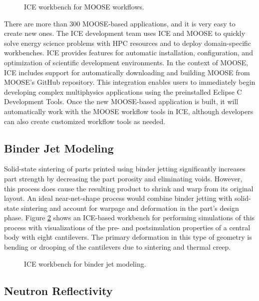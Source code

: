 \begin{figure}[htbp]
\centering
{}
\caption{ICE workbench for MOOSE workflows.}
\label{moose}
\end{figure}

There are more than 300 MOOSE-based applications, and it is very easy to create
new ones. The ICE development team uses ICE and MOOSE to quickly solve energy
science problems with HPC resources and to deploy domain-specific workbenches.
ICE provides features for automatic installation, configuration, and
optimization of scientific development environments. In the context of MOOSE,
ICE includes support for automatically downloading and building MOOSE from
MOOSE's GitHub repository. This integration enables users to immediately begin
developing complex multiphysics applications using the preinstalled Eclipse C
Development Tools. Once the new MOOSE-based application is built, it will
automatically work with the MOOSE workflow tools in ICE, although developers can
also create customized workflow tools as needed.

\subsection{Binder Jet Modeling}\label{binder-jet-modeling}

Solid-state sintering of parts printed using binder jetting
significantly increases part strength by decreasing the part porosity
and eliminating voids. However, this process does cause the resulting
product to shrink and warp from its original layout. An ideal near-net-shape 
process would combine binder jetting with solid-state sintering and account
for warpage and deformation in the part's design phase. 
Figure \ref{binder} shows an ICE-based workbench for performing simulations of
this process with visualizations of the pre- and postsimulation
properties of a central body with eight cantilevers. The primary
deformation in this type of geometry is bending or drooping of the
cantilevers due to sintering and thermal creep.

\begin{figure}[H]
\centering
{}
\caption{ICE workbench for binder jet modeling.}
\label{binder}
\end{figure}

\subsection{Neutron Reflectivity}\label{neutron-reflectivity}

